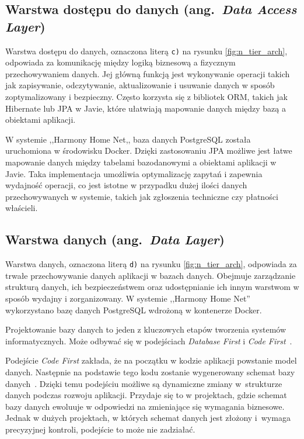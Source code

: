 \subsection{Warstwa dostępu do danych (ang.\ \emph{Data Access Layer})}

Warstwa dostępu do danych, oznaczona literą \texttt{c)} na rysunku \ref{fig:n_tier_arch}, odpowiada za komunikację między logiką biznesową a fizycznym przechowywaniem danych. Jej główną funkcją jest wykonywanie operacji takich jak zapisywanie, odczytywanie, aktualizowanie i usuwanie danych w sposób zoptymalizowany i bezpieczny. Często korzysta się z bibliotek ORM, takich jak Hibernate lub JPA w Javie, które ułatwiają mapowanie danych między bazą a obiektami aplikacji.

W systemie ,,Harmony Home Net,, baza danych PostgreSQL została uruchomiona w środowisku Docker. Dzięki zastosowaniu JPA możliwe jest łatwe mapowanie danych między tabelami bazodanowymi a obiektami aplikacji w Javie. Taka implementacja umożliwia optymalizację zapytań i zapewnia wydajność operacji, co jest istotne w przypadku dużej ilości danych przechowywanych w systemie, takich jak zgłoszenia techniczne czy płatności właścieli.

\subsection{Warstwa danych (ang.\ \emph{Data Layer})}
Warstwa danych, oznaczona literą \texttt{d)} na rysunku \ref{fig:n_tier_arch}, odpowiada za trwałe przechowywanie danych aplikacji w bazach danych. Obejmuje zarządzanie strukturą danych, ich bezpieczeństwem oraz udostępnianie ich innym warstwom w sposób wydajny i zorganizowany. W systemie ,,Harmony Home Net'' wykorzystano bazę danych PostgreSQL wdrożoną w kontenerze Docker. 

Projektowanie bazy danych to jeden z kluczowych etapów tworzenia systemów informatycznych. Może odbywać się w podejściach \emph{Database First} i \emph{Code First}~\cite{DB_FIRST_VS_CODE_FIRST_1,DB_FIRST_VS_CODE_FIRST_2}. 

Podejście \emph{Code First} zakłada, że na początku w kodzie aplikacji powstanie model danych. Następnie na podstawie tego kodu zostanie wygenerowany schemat bazy danych~\cite{CODE_FIRST}. Dzięki temu podejściu możliwe są dynamiczne zmiany w~strukturze danych podczas rozwoju aplikacji. Przydaje się to w projektach, gdzie schemat bazy danych ewoluuje w odpowiedzi na zmieniające się wymagania biznesowe. Jednak w dużych projektach, w których schemat danych jest złożony i~wymaga precyzyjnej kontroli, podejście to może nie zadziałać.

